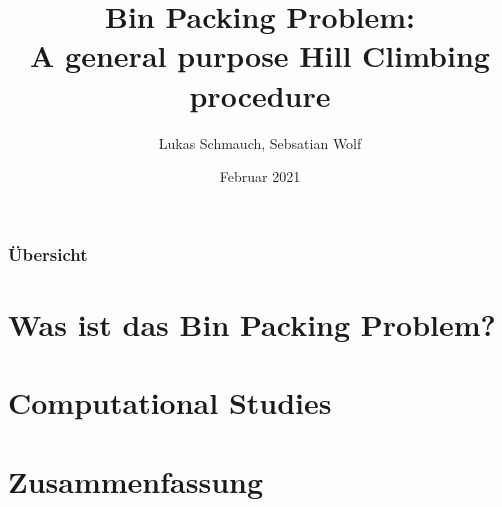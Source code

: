 \documentclass{beamer}
\title[BPP]{Bin Packing Problem:\\ A general purpose Hill Climbing procedure } %
\institute[FSU] %
{ 
Seminar Modern Heuristics \\
Dr. Rico Walter
}
\author{Lukas Schmauch, Sebsatian Wolf}
\date{Februar 2021} %
\begin{document}
\begin{frame}
\titlepage %
\end{frame}
\begin{frame}
\frametitle{Übersicht} 
\tableofcontents
\section{Was ist das Bin Packing Problem?} 
\section{Computational Studies}
\section{Zusammenfassung} 
\end{frame}

\end{document}
